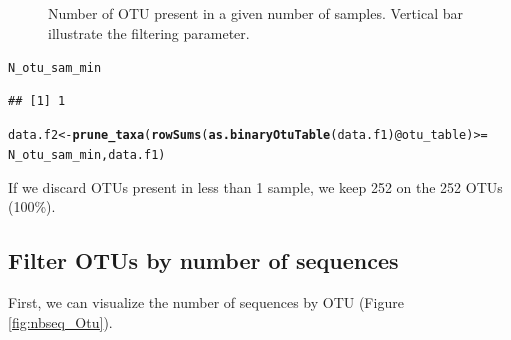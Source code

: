 \documentclass[12pt]{article}\usepackage[]{graphicx}\usepackage[]{color}
\makeatletter
\newcommand{\hlopt}[1]{\textcolor[rgb]{0,0,0}{#1}}%
\newcommand{\hlstd}[1]{\textcolor[rgb]{0.345,0.345,0.345}{#1}}%
\newcommand{\hlkwb}[1]{\textcolor[rgb]{0.69,0.353,0.396}{#1}}%
\newcommand{\hlkwc}[1]{\textcolor[rgb]{0.333,0.667,0.333}{#1}}%
\newcommand{\hlkwd}[1]{\textcolor[rgb]{0.737,0.353,0.396}{\textbf{#1}}}%
\newenvironment{kframe}{%
 \def\at@end@of@kframe{}%
 \ifinner\ifhmode%
  \def\at@end@of@kframe{\end{minipage}}%
  \begin{minipage}{\columnwidth}%
 \fi\fi%
 \def\FrameCommand##1{\hskip\@totalleftmargin \hskip-\fboxsep
 \colorbox{shadecolor}{##1}\hskip-\fboxsep
     \hskip-\linewidth \hskip-\@totalleftmargin \hskip\columnwidth}%
 \MakeFramed {\advance\hsize-\width
   \@totalleftmargin\z@ \linewidth\hsize
   \@setminipage}}%
 {\par\unskip\endMakeFramed%
 \at@end@of@kframe}
\newenvironment{knitrout}{}{} %
\numberwithin{figure}{section}
\makeatother
\begin{document}
\begin{knitrout}
\begin{figure}
{}

\caption[Number of OTU present in a given number of samples]{Number of OTU present in a given number of samples. Vertical bar illustrate the filtering parameter.}\label{fig:nbOtu_sample}
\end{figure}


\end{knitrout}

\begin{knitrout}\small
{}\color{fgcolor}\begin{kframe}
\begin{alltt}
\hlstd{N_otu_sam_min}
\end{alltt}
\begin{verbatim}
## [1] 1
\end{verbatim}
\end{kframe}
\end{knitrout}

\begin{knitrout}\small
{}\color{fgcolor}\begin{kframe}
\begin{alltt}
\hlstd{data.f2} \hlkwb{<-} \hlkwd{prune_taxa}\hlstd{(}\hlkwd{rowSums}\hlstd{(}\hlkwd{as.binaryOtuTable}\hlstd{(data.f1)}\hlopt{@}\hlkwc{otu_table}\hlstd{)} \hlopt{>=}
                        \hlstd{N_otu_sam_min, data.f1)}
\end{alltt}
\end{kframe}
\end{knitrout}

If we discard OTUs present in less than 1 sample, we keep 252 on the 252 OTUs (100\%).

 \subsection{Filter OTUs by number of sequences}

 First, we can visualize the number of sequences by OTU (Figure \ref{fig:nbseq_Otu}).
\end{document}
